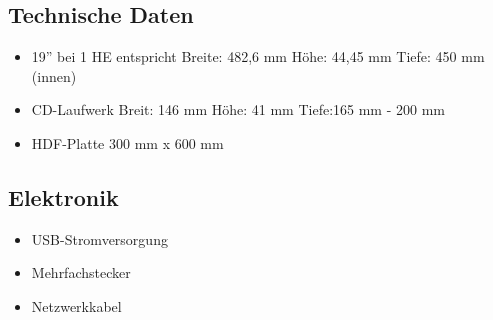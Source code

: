 \documentclass[10pt,a4paper]{article}%
\def\inch#1{#1''}
\begin{document}
\subsection{Technische Daten}
\begin{itemize}
\item \inch{19} bei 1 HE entspricht Breite: 482,6 mm Höhe: 44,45 mm Tiefe: 450 mm (innen)
\item CD-Laufwerk Breit: 146 mm Höhe: 41 mm Tiefe:165 mm - 200 mm 
\item HDF-Platte 300 mm x 600 mm
\end{itemize}
\subsection{Elektronik}
\begin{itemize}
\item USB-Stromversorgung
\item Mehrfachstecker
\item Netzwerkkabel
\end{itemize}

\end{document}
